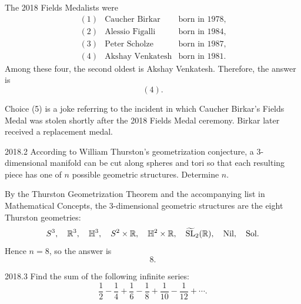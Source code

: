     \begin{solution}
        The 2018 Fields Medalists were
        \[
            \begin{array}{lll}
                (1) & \text{Caucher Birkar} & \text{born in 1978}, \\
                (2) & \text{Alessio Figalli} & \text{born in 1984}, \\
                (3) & \text{Peter Scholze} & \text{born in 1987}, \\
                (4) & \text{Akshay Venkatesh} & \text{born in 1981}.
            \end{array}
        \]
        Among these four, the second oldest is Akshay Venkatesh. Therefore, the answer is
        \[
            \boxed{(4)}.
        \]

        Choice (5) is a joke referring to the incident in which Caucher Birkar's Fields Medal was
        stolen shortly after the 2018 Fields Medal ceremony. Birkar later received a replacement
        medal.
    \end{solution}

    \begin{pastproblem}{2018.2}
        According to William Thurston's geometrization conjecture, a $3$-dimensional manifold can be
        cut along spheres and tori so that each resulting piece has one of $n$ possible geometric
        structures. Determine $n$.
    \end{pastproblem}

    \begin{solution}
        By the Thurston Geometrization Theorem and the accompanying list in
        Mathematical Concepts, the $3$-dimensional geometric structures are the
        eight Thurston geometries:
        \[
            S^3,\quad
            \mathbb{R}^3,\quad
            \mathbb{H}^3,\quad
            S^2 \times \mathbb{R},\quad
            \mathbb{H}^2 \times \mathbb{R},\quad
            \widetilde{\operatorname{SL}}_2(\mathbb{R}),\quad
            \mathrm{Nil},\quad
            \mathrm{Sol}.
        \]
        Hence $n=8$, so the answer is
        \[
            \boxed{8}.
        \]
    \end{solution}

    \begin{pastproblem}{2018.3}
        Find the sum of the following infinite series:
        \[
            \frac{1}{2}-\frac{1}{4}+\frac{1}{6}-\frac{1}{8}
            +\frac{1}{10}-\frac{1}{12}+\cdots.
        \]
    \end{pastproblem}

